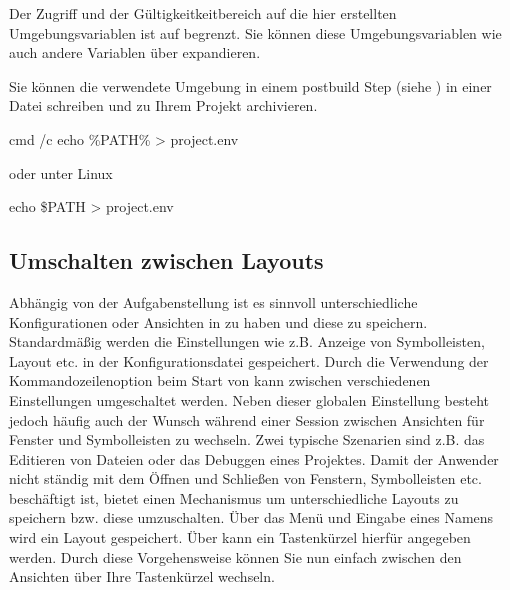 
Der Zugriff und der Gültigkeitkeitbereich auf die hier erstellten Umgebungsvariablen ist auf \codeblocks begrenzt. Sie können diese Umgebungsvariablen wie auch andere \codeblocks Variablen über  expandieren.



Sie können die verwendete Umgebung in einem postbuild Step (siehe ) in einer Datei  schreiben und zu Ihrem Projekt archivieren.

\begin{cmd}
cmd /c echo \%PATH\%  > project.env
\end{cmd}

oder unter Linux

\begin{cmd}
echo \$PATH > project.env
\end{cmd}

\subsection{Umschalten zwischen Layouts}

Abhängig von der Aufgabenstellung ist es sinnvoll unterschiedliche Konfigurationen oder Ansichten in \codeblocks zu haben und diese zu speichern. Standardmäßig werden die Einstellungen wie z.B. Anzeige von Symbolleisten, Layout etc. in der Konfigurationsdatei  gespeichert. Durch die Verwendung der Kommandozeilenoption  beim Start von \codeblocks kann zwischen verschiedenen Einstellungen umgeschaltet werden. Neben dieser globalen Einstellung besteht jedoch häufig auch der Wunsch während einer Session zwischen Ansichten für Fenster und Symbolleisten zu wechseln. Zwei typische Szenarien sind z.B. das Editieren von Dateien oder das Debuggen eines Projektes. Damit der Anwender nicht ständig mit dem Öffnen und Schließen von Fenstern, Symbolleisten etc. beschäftigt ist, bietet \codeblocks einen Mechanismus um unterschiedliche Layouts zu speichern bzw. diese umzuschalten. Über das Menü  und Eingabe eines Namens  wird ein Layout gespeichert. Über  kann ein Tastenkürzel hierfür angegeben werden. Durch diese Vorgehensweise können Sie nun einfach zwischen den Ansichten über Ihre Tastenkürzel wechseln.

